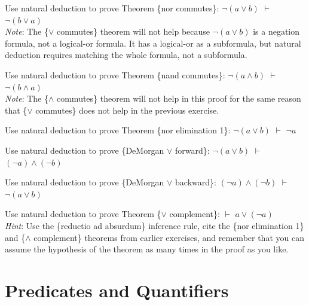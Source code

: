 {{\begin{ExerciseList}
\Exercise
Use natural deduction to prove
Theorem \{nor commutes\}: $\neg (a \vee b)$ $\vdash$ $\neg (b \vee a)$\\
\emph{Note}: The \{$\vee$ commutes\} theorem will not help because
$\neg (a \vee b)$ is a negation formula, not a logical-or formula.
It has a logical-or as a subformula, but natural deduction
requires matching the whole formula, not a subformula.

\Exercise
Use natural deduction to prove
Theorem \{nand commutes\}: $\neg (a \wedge b)$ $\vdash$ $\neg (b \wedge a)$\\
\emph{Note}: The \{$\wedge$ commutes\} theorem will not help in this proof
for the same reason that \{$\vee$ commutes\} does not help
in the previous exercise.

\Exercise
Use natural deduction to prove
Theorem \{nor elimination 1\}: $\neg (a \vee b)$ $\vdash$ $\neg a$

\Exercise
Use natural deduction to prove
\{DeMorgan $\vee$ forward\}:
$\neg (a \vee b)$ $\vdash$ $(\neg a) \wedge (\neg b)$

\Exercise
Use natural deduction to prove
\{DeMorgan $\vee$ backward\}:
$(\neg a) \wedge (\neg b)$ $\vdash$ $\neg (a \vee b)$

\Exercise
Use natural deduction to prove
Theorem \{$\vee$ complement\}: $\vdash$ $a \vee (\neg a)$ \\
\emph{Hint}: Use the \{reductio ad absurdum\} inference rule,
cite the \{nor elimination 1\} and \{$\wedge$ complement\}
theorems from earlier exercises,
and remember that you can assume the hypothesis
of the theorem as many times in the proof as you like.

\end{ExerciseList}


\section{Predicates and Quantifiers}
\label{sec:predicates-and-quantifiers}

}}
